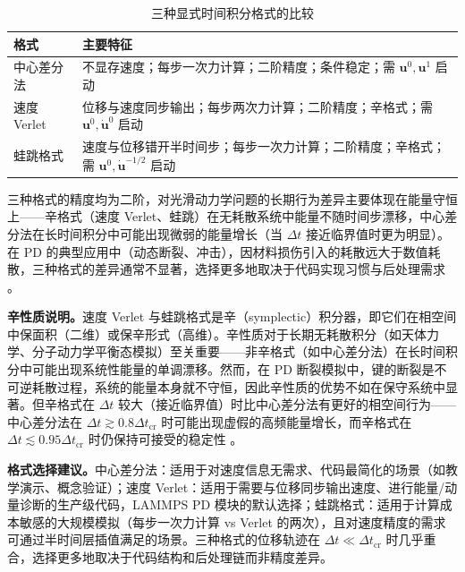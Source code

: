 \begin{table}[htbp]
  \centering
  \small
  \caption{三种显式时间积分格式的比较}
  \label{tab:exp-schemes}
  \begin{tabular}{>{\raggedright\arraybackslash}p{}>{\raggedright\arraybackslash}p{}}
    \toprule
    格式 & 主要特征 \\
    \midrule
    中心差分法 & 不显存速度；每步一次力计算；二阶精度；条件稳定；需 $\mathbf{u}^{0},\mathbf{u}^{1}$ 启动 \\
    速度 Verlet  & 位移与速度同步输出；每步两次力计算；二阶精度；辛格式；需 $\mathbf{u}^{0},\dot{\mathbf{u}}^{0}$ 启动 \\
    蛙跳格式     & 速度与位移错开半时间步；每步一次力计算；二阶精度；辛格式；需 $\mathbf{u}^{0},\dot{\mathbf{u}}^{-1/2}$ 启动 \\
    \bottomrule
  \end{tabular}
\end{table}

三种格式的精度均为二阶，对光滑动力学问题的长期行为差异主要体现在能量守恒上——辛格式（速度 Verlet、蛙跳）在无耗散系统中能量不随时间步漂移，中心差分法在长时间积分中可能出现微弱的能量增长（当 $\Delta t$ 接近临界值时更为明显）。在 PD 的典型应用中（动态断裂、冲击），因材料损伤引入的耗散远大于数值耗散，三种格式的差异通常不显著，选择更多地取决于代码实现习惯与后处理需求 \cite{Parks2008,SillingAskari2005}。

\textbf{辛性质说明。}速度 Verlet 与蛙跳格式是辛（symplectic）积分器，即它们在相空间中保面积（二维）或保辛形式（高维）。辛性质对于长期无耗散积分（如天体力学、分子动力学平衡态模拟）至关重要——非辛格式（如中心差分法）在长时间积分中可能出现系统性能量的单调漂移。然而，在 PD 断裂模拟中，键的断裂是不可逆耗散过程，系统的能量本身就不守恒，因此辛性质的优势不如在保守系统中显著。但辛格式在 $\Delta t$ 较大（接近临界值）时比中心差分法有更好的相空间行为——中心差分法在 $\Delta t\gtrsim0.8\Delta t_{\text{cr}}$ 时可能出现虚假的高频能量增长，而辛格式在 $\Delta t\lesssim0.95\Delta t_{\text{cr}}$ 时仍保持可接受的稳定性 \cite{BelytschkoLiuMoran2000}。

\textbf{格式选择建议。}中心差分法：适用于对速度信息无需求、代码最简化的场景（如教学演示、概念验证）；速度 Verlet：适用于需要与位移同步输出速度、进行能量/动量诊断的生产级代码，LAMMPS PD 模块的默认选择；蛙跳格式：适用于计算成本敏感的大规模模拟（每步一次力计算 vs Verlet 的两次），且对速度精度的需求可通过半时间层插值满足的场景。三种格式的位移轨迹在 $\Delta t\ll\Delta t_{\text{cr}}$ 时几乎重合，选择更多地取决于代码结构和后处理链而非精度差异。

